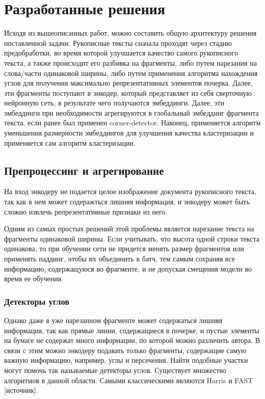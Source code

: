\newpage
\section{Разработанные решения}
    Исходя из вышеописанных работ, можно составить общую архитектуру решения поставленной задачи. Рукописные тексты сначала проходят через стадию предобработки, во время которой улучшается качество самого рукописного текста, а также происходит его разбивка на фрагменты, либо путем нарезания на слова/части одинаковой ширины, либо путем применения алгоритма нахождения углов для получения максимально репрезентативных элементов почерка.
    Далее, эти фрагменты поступают в энкодер, который представляет из себя сверточную нейронную сеть, в результате чего получаются эмбеддинги. Далее, эти эмбеддинги при необходимости агрегируются в глобальный эмбеддинг фрагмента текста, если ранее был применен corner-detector. Наконец, применяется алгоритм уменьшения размерности эмбеддингов для улучшения качества кластеризации и применяется сам алгоритм кластеризации.

\subsection{Препроцессинг и агрегирование}

    На вход энкодеру не подается целое изображение документа рукописного текста, так как в нем может содеражться лишняя информация, и энкодеру может быть сложно извлечь репрезентативные признаки из него.

    Одним из самых простых решений этой проблемы является нарезание текста на фрагменты одинаковой ширины. Если учитывать, что высота одной строки текста одинакова, то при обучении сети не придется менять размер фрагментов или применять паддинг, чтобы их объединить в батч, тем самым сохраняя все информацию, содержащуюся во фрагменте, и не допуская смещения модели во время ее обучения. 

\subsubsection{Детекторы углов}

    Однако даже в уже нарезанном фрагменте может содержаться лишняя информация, так как прямые линии, содержащиеся в почерке, и пустые элементы на бумаге не содержат много информации, по которой можно различить автора. В связи с этим можно энкодеру подавать только фрагменты, содержащие самую важную информацию, например, углы и персечения. Найти подобные участки могут помочь так называемые детекторы углов. Существует множество алгоритмов в данной области. Самыми классическими являются Harris и FAST [источник].

